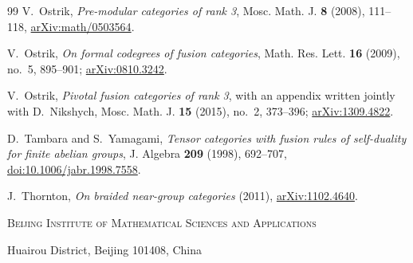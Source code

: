 \documentclass[11pt,a4paper]{article}
\theoremstyle{definition}
\theoremstyle{remark}
\numberwithin{equation}{section}
\begin{document}
\begin{thebibliography}{99}
V.~Ostrik, \emph{Pre-modular categories of rank 3},
Mosc. Math. J. \textbf{8} (2008), 111--118,
\href{https://arxiv.org/abs/math/0503564}{arXiv:math/0503564}.

V.~Ostrik, \emph{On formal codegrees of fusion categories},
Math. Res. Lett. \textbf{16} (2009), no.~5, 895--901;
\href{https://arxiv.org/abs/0810.3242}{arXiv:0810.3242}.

V.~Ostrik, \emph{Pivotal fusion categories of rank 3}, with an appendix written jointly with D.~Nikshych,
Mosc. Math. J. \textbf{15} (2015), no.~2, 373--396;
\href{https://arxiv.org/abs/1309.4822}{arXiv:1309.4822}.

D.~Tambara and S.~Yamagami,
\emph{Tensor categories with fusion rules of self-duality for finite abelian groups},
J. Algebra \textbf{209} (1998), 692--707,
\href{https://doi.org/10.1006/jabr.1998.7558}{doi:10.1006/jabr.1998.7558}.

J.~Thornton, \emph{On braided near-group categories} (2011),
\href{https://arxiv.org/abs/1102.4640}{arXiv:1102.4640}.
\end{thebibliography}

\par\medskip
{\small\noindent\textsc{Beijing Institute of Mathematical Sciences and Applications}\par
\noindent Huairou District, Beijing 101408, China\par}
\end{document}
